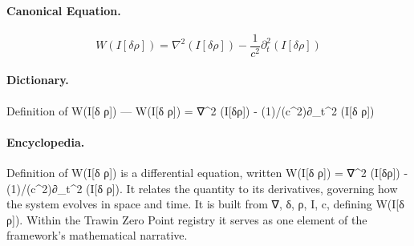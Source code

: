 \paragraph{Canonical Equation.}
\[
W(I[\delta \rho]) = \nabla^2 (I[\delta\rho]) - \frac{1}{c^2}\partial_t^2 (I[\delta \rho])
\]

\paragraph{Dictionary.}
Definition of W(I[δ ρ]) — W(I[δ ρ]) = ∇\textasciicircum{}2 (I[δρ]) - (1)/(c\textasciicircum{}2)∂\_t\textasciicircum{}2 (I[δ ρ])

\paragraph{Encyclopedia.}
Definition of W(I[δ ρ]) is a differential equation, written W(I[δ ρ]) = ∇\textasciicircum{}2 (I[δρ]) - (1)/(c\textasciicircum{}2)∂\_t\textasciicircum{}2 (I[δ ρ]). It relates the quantity to its derivatives, governing how the system evolves in space and time. It is built from ∇, δ, ρ, I, c, defining W(I[δ ρ]). Within the Trawin Zero Point registry it serves as one element of the framework's mathematical narrative.
